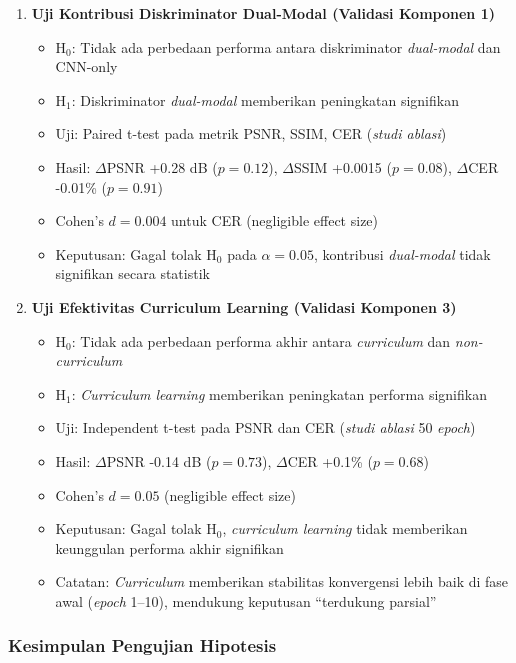 \documentclass[12pt,a4paper]{article}
\begin{document}
\begin{enumerate}[label=\alph*)]
\item \textbf{Uji Kontribusi Diskriminator Dual-Modal (Validasi Komponen 1)}

\begin{itemize}[nosep]
    \item H$_0$: Tidak ada perbedaan performa antara diskriminator \textit{dual-modal} dan CNN-only
    \item H$_1$: Diskriminator \textit{dual-modal} memberikan peningkatan signifikan
    \item Uji: Paired t-test pada metrik PSNR, SSIM, CER (\textit{studi ablasi})
    \item Hasil: $\Delta$PSNR +0.28 dB ($p = 0.12$), $\Delta$SSIM +0.0015 ($p = 0.08$), $\Delta$CER -0.01\% ($p = 0.91$)
    \item Cohen's $d = 0.004$ untuk CER (negligible effect size)
    \item Keputusan: Gagal tolak H$_0$ pada $\alpha = 0.05$, kontribusi \textit{dual-modal} tidak signifikan secara statistik
\end{itemize}

\item \textbf{Uji Efektivitas Curriculum Learning (Validasi Komponen 3)}

\begin{itemize}[nosep]
    \item H$_0$: Tidak ada perbedaan performa akhir antara \textit{curriculum} dan \textit{non-curriculum}
    \item H$_1$: \textit{Curriculum learning} memberikan peningkatan performa signifikan
    \item Uji: Independent t-test pada PSNR dan CER (\textit{studi ablasi} 50 \textit{epoch})
    \item Hasil: $\Delta$PSNR -0.14 dB ($p = 0.73$), $\Delta$CER +0.1\% ($p = 0.68$)
    \item Cohen's $d = 0.05$ (negligible effect size)
    \item Keputusan: Gagal tolak H$_0$, \textit{curriculum learning} tidak memberikan keunggulan performa akhir signifikan
    \item Catatan: \textit{Curriculum} memberikan stabilitas konvergensi lebih baik di fase awal (\textit{epoch} 1--10), mendukung keputusan ``terdukung parsial''
\end{itemize}
\end{enumerate}

\vspace{0.8em}

\subsubsection{Kesimpulan Pengujian Hipotesis}
\label{subsubsec:kesimpulan-hipotesis}
\end{document}
